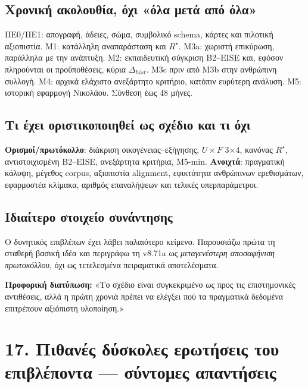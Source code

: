 \documentclass[9pt,a4paper]{extarticle}
\newcommand{\say}[1]{\begin{keybox}\textbf{Προφορική διατύπωση:} #1\end{keybox}}
\begin{document}
\subsection*{Χρονική ακολουθία, όχι «όλα μετά από όλα»}
ΠΕ0/ΠΕ1: απογραφή, άδειες, σώμα, συμβολικό schema, κάρτες και πιλοτική αξιοπιστία. M1: κατάλληλη αναπαράσταση και \(R^\star\). M3a: χωριστή επικύρωση, παράλληλα με την ανάπτυξη. M2: εκπαιδευτική σύγκριση B2--EISE και, εφόσον πληρούνται οι προϋποθέσεις, κύρια \(\Delta_{hist}\). M3c πριν από M3b στην ανθρώπινη συλλογή. M4: αρχικά ελάχιστο ανεξάρτητο κριτήριο, κατόπιν ευρύτερη ανάλυση. M5: ιστορική εφαρμογή Νικολάου. Σύνθεση έως 48 μήνες.
\subsection*{Τι έχει οριστικοποιηθεί ως σχέδιο και τι όχι}
\textbf{Ορισμοί/πρωτόκολλο}: διάκριση οικογένειας--εξήγησης, \(U\times F\) 3×4, κανόνας \(R^\star\), αντιστοιχισμένη B2--EISE, ανεξάρτητα κριτήρια, M5-min. \textbf{Ανοιχτά}: πραγματική κάλυψη, μέγεθος corpus, αξιοπιστία alignment, εφικτότητα ανθρώπινων ερεθισμάτων, εφαρμοστέα κλίμακα, αριθμός επαναλήψεων και τελικές υπερπαράμετροι.
\subsection*{Ιδιαίτερο στοιχείο συνάντησης}
Ο δυνητικός επιβλέπων έχει λάβει παλαιότερο κείμενο. Παρουσιάζω πρώτα τη σταθερή βασική ιδέα και περιγράφω τη v8.71a ως \emph{μεταγενέστερη αποσαφήνιση πρωτοκόλλου}, όχι ως τετελεσμένα πειραματικά αποτελέσματα.
\say{«Το σχέδιο είναι συγκεκριμένο ως προς τις επιστημονικές αντιθέσεις, αλλά η πρώτη χρονιά πρέπει να ελέγξει πού τα πραγματικά δεδομένα επιτρέπουν αξιόπιστη υλοποίηση.»}
\newpage
\section*{17. Πιθανές δύσκολες ερωτήσεις του επιβλέποντα — σύντομες απαντήσεις}
\end{document}
